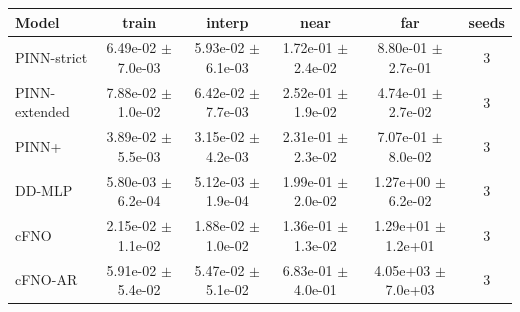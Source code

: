 \begin{tabular}{lccccc}
\toprule
Model & train & interp & near & far & seeds \\
\midrule
PINN-strict & 6.49e-02 $\pm$ 7.0e-03 & 5.93e-02 $\pm$ 6.1e-03 & 1.72e-01 $\pm$ 2.4e-02 & 8.80e-01 $\pm$ 2.7e-01 & 3 \\
PINN-extended & 7.88e-02 $\pm$ 1.0e-02 & 6.42e-02 $\pm$ 7.7e-03 & 2.52e-01 $\pm$ 1.9e-02 & 4.74e-01 $\pm$ 2.7e-02 & 3 \\
PINN+ & 3.89e-02 $\pm$ 5.5e-03 & 3.15e-02 $\pm$ 4.2e-03 & 2.31e-01 $\pm$ 2.3e-02 & 7.07e-01 $\pm$ 8.0e-02 & 3 \\
DD-MLP & 5.80e-03 $\pm$ 6.2e-04 & 5.12e-03 $\pm$ 1.9e-04 & 1.99e-01 $\pm$ 2.0e-02 & 1.27e+00 $\pm$ 6.2e-02 & 3 \\
cFNO & 2.15e-02 $\pm$ 1.1e-02 & 1.88e-02 $\pm$ 1.0e-02 & 1.36e-01 $\pm$ 1.3e-02 & 1.29e+01 $\pm$ 1.2e+01 & 3 \\
cFNO-AR & 5.91e-02 $\pm$ 5.4e-02 & 5.47e-02 $\pm$ 5.1e-02 & 6.83e-01 $\pm$ 4.0e-01 & 4.05e+03 $\pm$ 7.0e+03 & 3 \\
\bottomrule
\end{tabular}
